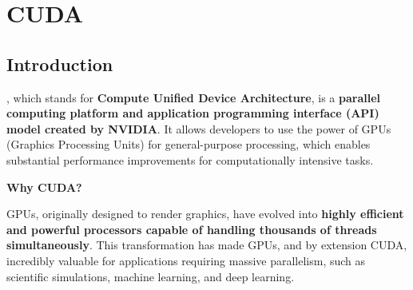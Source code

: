 \section{CUDA}

\subsection{Introduction}

, which stands for \textbf{Compute Unified Device Architecture}, is a \textbf{parallel computing platform and application programming interface (API) model created by NVIDIA}. It allows developers to use the power of GPUs (Graphics Processing Units) for general-purpose processing, which enables substantial performance improvements for computationally intensive tasks.

\highspace
\begin{flushleft}
    \textcolor{Green3}{ \textbf{Why CUDA?}}
\end{flushleft}
GPUs, originally designed to render graphics, have evolved into \textbf{highly efficient and powerful processors capable of handling thousands of threads simultaneously}. This transformation has made GPUs, and by extension CUDA, incredibly valuable for applications requiring massive parallelism, such as scientific simulations, machine learning, and deep learning.

